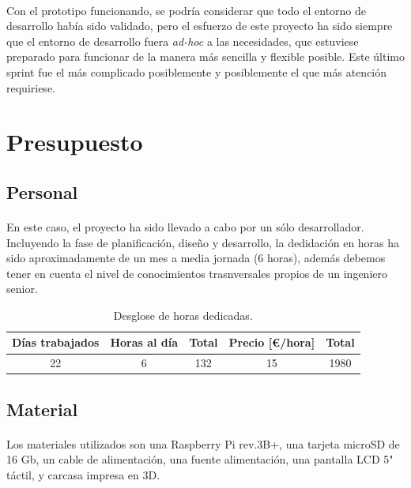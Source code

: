 \paragraph{}Con el prototipo funcionando, se podría considerar que todo el entorno de
desarrollo había sido validado, pero el esfuerzo de este proyecto ha sido siempre que
el entorno de desarrollo fuera \emph{ad-hoc} a las necesidades, que estuviese preparado
para funcionar de la manera más sencilla y flexible posible. Este último sprint fue el
más complicado posiblemente y posiblemente el que más atención requiriese.

\section{Presupuesto}

\subsection{Personal}

\paragraph{} En este caso, el proyecto ha sido llevado a cabo por un sólo desarrollador.
Incluyendo la fase de planificación, diseño y desarrollo, la dedidación en horas ha sido
aproximadamente de un mes a media jornada (6 horas), además debemos tener en cuenta el
nivel de conocimientos trasnversales propios de un ingeniero senior.


\begin{table}[hbt]
	\label{t:recursoshumanos}
	\centering
	\begin{tabular}{|c|c|c|c|c|}
		\hline
        \textbf{Días trabajados} & \textbf{Horas al día} & \textbf{Total} & Precio [\euro/hora] & \textbf{Total} \\
		\hline
		22 & 6 & 132 & 15 & 1980 \\
		\hline
	\end{tabular}
	\caption{Desglose de horas dedicadas.}
\end{table}

\subsection{Material}

\paragraph{}Los materiales utilizados son una Raspberry Pi rev.3B+, una tarjeta microSD
de 16 Gb, un cable de alimentación, una fuente alimentación, una pantalla LCD 5" táctil,
y carcasa impresa en 3D.



